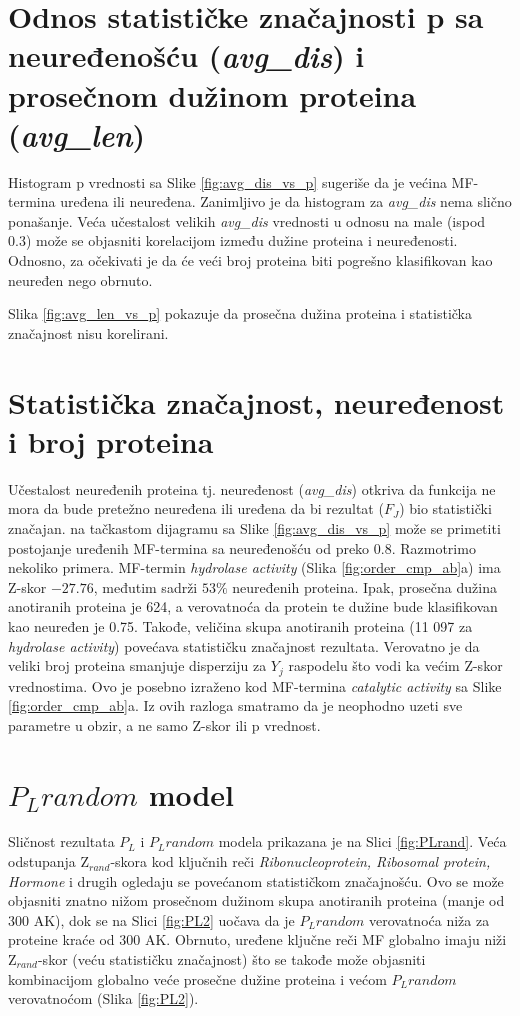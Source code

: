 \section{Odnos statističke značajnosti p sa neuređenošću (\textit{avg\_dis}) i prosečnom dužinom proteina (\textit{avg\_len}) }

Histogram p vrednosti sa Slike \ref{fig:avg_dis_vs_p} sugeriše da je većina
MF-termina uređena ili neuređena. Zanimljivo je da histogram za
\textit{avg\_dis} nema slično ponašanje. Veća učestalost velikih
\textit{avg\_dis} vrednosti u odnosu na male (ispod 0.3) može se objasniti
korelacijom između dužine proteina i neuređenosti. Odnosno, za očekivati je da
će veći broj proteina biti pogrešno klasifikovan kao neuređen nego obrnuto.

Slika \ref{fig:avg_len_vs_p} pokazuje da prosečna dužina proteina 
i statistička značajnost nisu korelirani. 


\section{Statistička značajnost, neuređenost i broj proteina}

Učestalost neuređenih proteina tj. neuređenost  (\textit{avg\_dis}) otkriva da
funkcija ne mora da bude pretežno neuređena ili uređena da bi rezultat ($F_J$)
bio statistički značajan. na tačkastom dijagramu sa
Slike \ref{fig:avg_dis_vs_p} može se primetiti postojanje uređenih
MF-termina sa neuređenošću od preko 0.8.  Razmotrimo nekoliko primera.
MF-termin \textit{hydrolase activity} (Slika \ref{fig:order_cmp_ab}a) ima
Z-skor $-27.76$, međutim sadrži $53\%$ neuređenih proteina. Ipak, prosečna
dužina anotiranih proteina je 624, a verovatnoća da protein te dužine bude
klasifikovan kao neuređen je 0.75.  Takođe, veličina skupa anotiranih proteina
(11 097 za \textit{hydrolase activity}) povećava statističku značajnost
rezultata. Verovatno je da veliki broj proteina smanjuje disperziju za $Y_j$
raspodelu što vodi ka većim Z-skor vrednostima.  Ovo je posebno izraženo kod
MF-termina \textit{catalytic activity} sa Slike \ref{fig:order_cmp_ab}a.  Iz
ovih razloga smatramo da je neophodno uzeti sve parametre u obzir, a ne samo
Z-skor ili p vrednost.

\section{$P_Lrandom$ model}

Sličnost rezultata $P_L$ i $P_L random$ modela prikazana je na Slici
\ref{fig:PLrand}. Veća odstupanja Z$_{rand}$-skora kod ključnih reči
\textit{Ribonucleoprotein, Ribosomal protein, Hormone} i drugih ogledaju se
povećanom statističkom značajnošću. Ovo se može objasniti znatno
nižom prosečnom dužinom skupa anotiranih proteina (manje od 300 AK), dok se na
Slici \ref{fig:PL2} uočava da je $P_L random$ verovatnoća niža za proteine
kraće od 300 AK.  Obrnuto, uređene ključne reči MF globalno imaju niži
Z$_{rand}$-skor (veću statističku značajnost) što se takođe može objasniti
kombinacijom globalno veće prosečne dužine proteina i većom $P_L random$
verovatnoćom (Slika \ref{fig:PL2}). 

